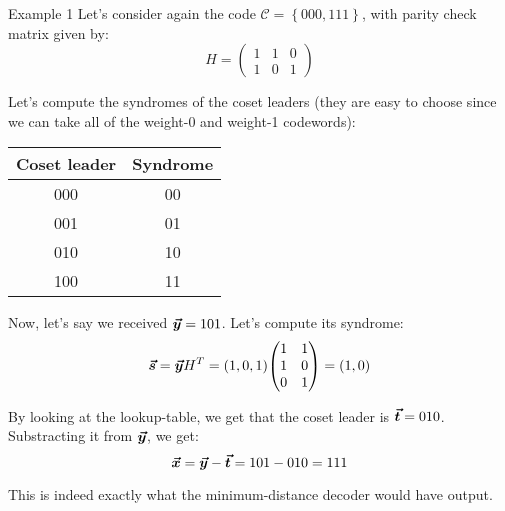 \documentclass[a4paper]{article}
\begin{document}
\begin{parag}{Example 1}
    Let's consider again the code $\mathcal{C} = \left\{000, 111\right\}$, with parity check matrix given by: 
    \[H = \begin{pmatrix} 1 & 1 & 0 \\ 1 & 0 & 1 \end{pmatrix} \]
    
    Let's compute the syndromes of the coset leaders (they are easy to choose since we can take all of the weight-0 and weight-1 codewords):
    \begin{center}
    \begin{tabular}{c|c}
        Coset leader & Syndrome  \\
        \hline
        000 & 00 \\
        001 & 01 \\
        010 & 10 \\
        100 & 11
    \end{tabular}
    \end{center}

    Now, let's say we received $\bm{\protect\vec{y}} = 101$. Let's compute its syndrome: 
    \[\bvec{s} = \bvec{y} H^T = \left(1, 0, 1\right) \begin{pmatrix} 1 & 1 \\ 1 & 0 \\ 0 & 1 \end{pmatrix} = \left(1, 0\right)\]
    
    By looking at the lookup-table, we get that the coset leader is $\bm{\protect\vec{t}} = 010$. Substracting it from $\bm{\protect\vec{y}}$, we get: 
    \[\bm{\protect\vec{x}} = \bm{\protect\vec{y}} - \bm{\protect\vec{t}} = 101 - 010 = 111\]
    
    This is indeed exactly what the minimum-distance decoder would have output.
\end{parag}
\end{document}
